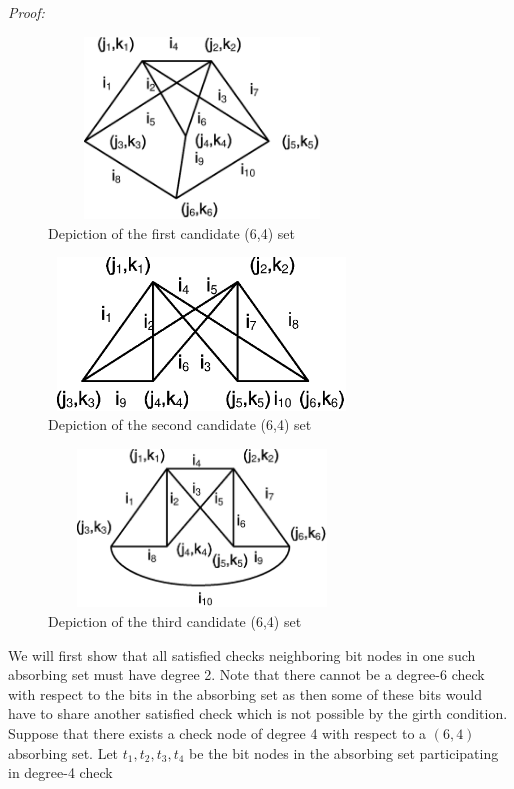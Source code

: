 \noindent \textit{Proof:}
\begin{figure}[ht]
\center\includegraphics[width=3.2in,height=1.9in]{Drawing641_1.eps}
\caption{Depiction of the first candidate (6,4) set}\label{fig64a}
\end{figure}
\begin{figure}\center
\includegraphics[width=3.2in,height=1.6in]{Drawing643_1.eps}
\caption{Depiction of the second candidate (6,4)
set}\label{fig64b}
\end{figure}
\begin{figure}
\center\includegraphics[width=3.2in,height=1.65in]{Drawing642_2.eps}
\caption{Depiction of the third candidate (6,4) set}
\label{fig64c}
\end{figure}
We will first show that all satisfied checks neighboring bit nodes
in one such absorbing set must have degree 2. Note that there
cannot be a degree-6 check with respect to the bits in the
absorbing set as then some of these bits would have to share
another satisfied check which is not possible by the girth
condition. Suppose that there exists a check node of degree 4 with
respect to a $(6,4)$ absorbing set. Let $t_1, t_2,t_3,t_4$ be the
bit nodes in the absorbing set participating in degree-4 check
